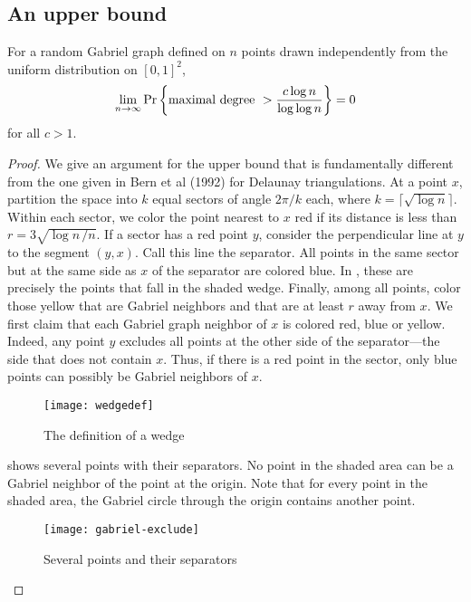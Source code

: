 \documentclass[lotsofwhite,charterfonts]{patmorin}
\newcommand{\PROB}{\Pr}
\begin{document}
\subsection{An upper bound}

\begin{thm}
For a random Gabriel graph defined on $n$ points drawn
independently from the uniform distribution on
$[0,1]^2$, 
$$
\lim_{n\to\infty} \PROB \left\{ \hbox{\rm maximal degree}~> {c \log n \over
\log \log n} \right\} = 0
$$
for all $c > 1$.
\end{thm}

\begin{proof}
We give an argument for the upper bound that is fundamentally
different from the one given in Bern et al (1992) for Delaunay
triangulations.
At a point $x$, partition the space into $k$ equal
sectors of angle $2\pi/k$ each, where $k = \lceil \sqrt{\log n} \rceil$.
Within each sector, we color the point nearest to $x$ 
red if its distance is less than $r = 3 \sqrt{\log n\, /n}$.
If a sector has a red point $y$, consider the perpendicular
line at $y$ to the segment $(y,x)$. Call this
line the separator. All points
in the same sector but at the same side as $x$ of the separator
are colored blue. In , these are precisely the points that
fall in the shaded wedge.
Finally, among all points, color those yellow that are
Gabriel neighbors and that are at least $r$ away from $x$.
We first claim that each Gabriel graph neighbor of $x$
is colored red, blue or yellow.
Indeed, any point $y$ excludes all points at the
other side of the separator---the side that does not contain $x$.
Thus, if there is a red point in the sector, only blue points
can possibly be Gabriel neighbors of $x$.


\begin{figure}
\begin{center}\texttt{[image: wedgedef]}\end{center}
\caption{The definition of a wedge}
\end{figure}

 shows several points with their separators.
No point in the shaded area can be a Gabriel neighbor of the point at the
origin. Note that for every point in the shaded area, the Gabriel circle
through the origin contains another point.

\begin{figure}
\begin{center}\texttt{[image: gabriel-exclude]}\end{center}
\caption{Several points and their separators}
\end{figure}


\end{proof}
\end{document}

